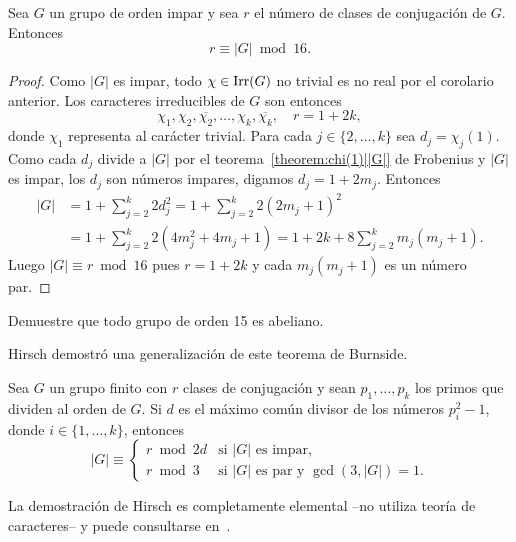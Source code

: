 \begin{theorem}[Burnside]
  Sea $G$ un grupo de orden impar y sea $r$ el número de clases de conjugación
  de $G$. Entonces 
  \[
	  r\equiv|G|\bmod{16}.
  \]
\end{theorem}

\begin{proof}
  Como $|G|$ es impar, todo $\chi\in\operatorname{Irr}(G)$ no trivial es no real por el
  corolario anterior. Los caracteres irreducibles de $G$ son entonces 
  \[
    \chi_1,\chi_2,\overline{\chi_2},\dots,\chi_k,\overline{\chi_k},
    \quad
    r=1+2k,
  \]
  donde $\chi_1$ representa al carácter trivial. 
  Para cada $j\in\{2,\dots,k\}$ sea $d_j=\chi_j(1)$.   Como cada $d_j$ divide a
  $|G|$ por el teorema~\ref{theorem:chi(1)||G|} de Frobenius y $|G|$ es impar, los $d_j$ son
  números impares, digamos $d_j=1+2m_j$. Entonces 
  \begin{align*}
    |G|&=1+\sum_{j=2}^k 2d_j^2=1+\sum_{j=2}^k2(2m_j+1)^2\\
    &=1+\sum_{j=2}^k2(4m_j^2+4m_j+1)
    =1+2k+8\sum_{j=2}^km_j(m_j+1).
  \end{align*}
  Luego $|G|\equiv r\bmod{16}$ pues $r=1+2k$ y cada $m_j(m_j+1)$ es un número par. 
\end{proof}

\begin{exercise}
Demuestre que todo grupo de orden 15 es abeliano.
\end{exercise}

Hirsch demostró una generalización de este teorema de Burnside. 

\begin{theorem}[Hirsch]
Sea $G$ un grupo finito con $r$ clases de conjugación y sean 
$p_1,\dots,p_k$ los primos que dividen al orden de $G$. Si 
$d$ es el máximo común divisor de los números $p_i^2-1$, donde $i\in\{1,\dots,k\}$, 
entonces
\[
|G|\equiv\begin{cases}
r\bmod 2d&\text{si $|G|$ es impar},\\
r\bmod 3&\text{si $|G|$ es par y $\gcd(3,|G|)=1$.}
\end{cases}
\]
\end{theorem}

La demostración de Hirsch es completamente elemental --no utiliza teoría de caracteres-- 
y puede consultarse en~\cite{MR36755}. 



